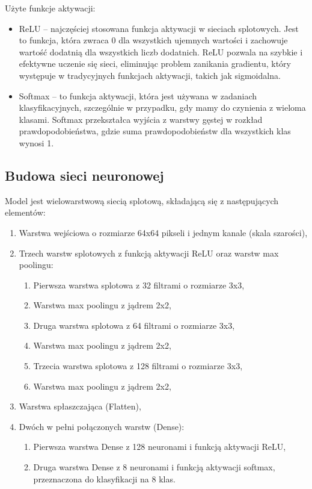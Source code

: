 Użyte funkcje aktywacji:
\begin{itemize}
    \item ReLU -- najczęściej stosowana funkcja aktywacji w sieciach splotowych.
    Jest to funkcja, która zwraca 0 dla wszystkich ujemnych wartości i zachowuje wartość dodatnią dla wszystkich liczb dodatnich.
    ReLU pozwala na szybkie i efektywne uczenie się sieci, eliminując problem zanikania gradientu,
    który występuje w tradycyjnych funkcjach aktywacji, takich jak sigmoidalna.
    \item Softmax -- to funkcja aktywacji, która jest używana w zadaniach klasyfikacyjnych,
    szczególnie w przypadku, gdy mamy do czynienia z wieloma klasami.
    Softmax przekształca wyjścia z warstwy gęstej w rozkład prawdopodobieństwa,
    gdzie suma prawdopodobieństw dla wszystkich klas wynosi 1.
\end{itemize}

\subsection{Budowa sieci neuronowej}\label{subsec:budowa-sieci-neuronowej}
Model jest wielowarstwową siecią splotową,
składającą się z następujących elementów:

\begin{enumerate}
    \item Warstwa wejściowa o rozmiarze 64x64 pikseli i jednym kanale (skala szarości),
    \item Trzech warstw splotowych z funkcją aktywacji ReLU oraz warstw max poolingu:
    \begin{enumerate}
        \item Pierwsza warstwa splotowa z 32 filtrami o rozmiarze 3x3,
        \item Warstwa max poolingu z jądrem 2x2,
        \item Druga warstwa splotowa z 64 filtrami o rozmiarze 3x3,
        \item Warstwa max poolingu z jądrem 2x2,
        \item Trzecia warstwa splotowa z 128 filtrami o rozmiarze 3x3,
        \item Warstwa max poolingu z jądrem 2x2,
    \end{enumerate}
    \item Warstwa spłaszczająca (Flatten),
    \item Dwóch w pełni połączonych warstw (Dense):
    \begin{enumerate}
        \item Pierwsza warstwa Dense z 128 neuronami i funkcją aktywacji ReLU,
        \item Druga warstwa Dense z 8 neuronami i funkcją aktywacji softmax, przeznaczona do klasyfikacji na 8 klas.
    \end{enumerate}
\end{enumerate}

